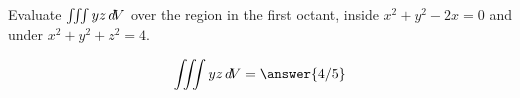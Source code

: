 \documentclass{ximera}
\author{David Guichard \and Neal Koblitz \and H. Jerome Keisler \and Albert Scheller \and Barry Balof \and Mike Wills \and Matthew Carr}
\begin{document}
\begin{exercise}




Evaluate $\iiint yz \mathop{}\!d\! V$ over the region in the first octant, inside $x^2+y^2-2x=0$ and under $x^2+y^2+z^2=4$. 

\begin{prompt}
\[
\iiint yz \d V=\answer{4/5}
\]
\end{prompt}



\end{exercise}
\end{document}
